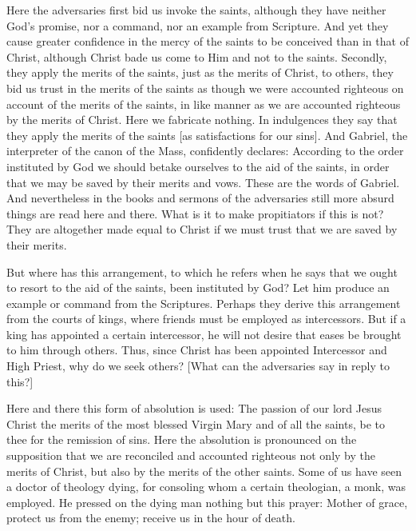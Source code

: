 Here the adversaries first bid us invoke the saints, although they
have neither God's promise, nor a command, nor an example from
Scripture.  And yet they cause greater confidence in the mercy of the
saints to be conceived than in that of Christ, although Christ bade
us come to Him and not to the saints.  Secondly, they apply the
merits of the saints, just as the merits of Christ, to others, they
bid us trust in the merits of the saints as though we were accounted
righteous on account of the merits of the saints, in like manner as
we are accounted righteous by the merits of Christ.  Here we
fabricate nothing.  In indulgences they say that they apply the
merits of the saints [as satisfactions for our sins].  And Gabriel,
the interpreter of the canon of the Mass, confidently declares:
According to the order instituted by God we should betake ourselves
to the aid of the saints, in order that we may be saved by their
merits and vows.  These are the words of Gabriel.  And nevertheless
in the books and sermons of the adversaries still more absurd things
are read here and there.  What is it to make propitiators if this is
not?  They are altogether made equal to Christ if we must trust that
we are saved by their merits.

But where has this arrangement, to which he refers when he says that
we ought to resort to the aid of the saints, been instituted by God?
Let him produce an example or command from the Scriptures.  Perhaps
they derive this arrangement from the courts of kings, where friends
must be employed as intercessors.  But if a king has appointed a
certain intercessor, he will not desire that eases be brought to him
through others.  Thus, since Christ has been appointed Intercessor
and High Priest, why do we seek others?  [What can the adversaries
say in reply to this?]

Here and there this form of absolution is used: The passion of our
lord Jesus Christ the merits of the most blessed Virgin Mary and of
all the saints, be to thee for the remission of sins.  Here the
absolution is pronounced on the supposition that we are reconciled
and accounted righteous not only by the merits of Christ, but also by
the merits of the other saints.  Some of us have seen a doctor of
theology dying, for consoling whom a certain theologian, a monk, was
employed.  He pressed on the dying man nothing but this prayer:
Mother of grace, protect us from the enemy; receive us in the hour of
death.

